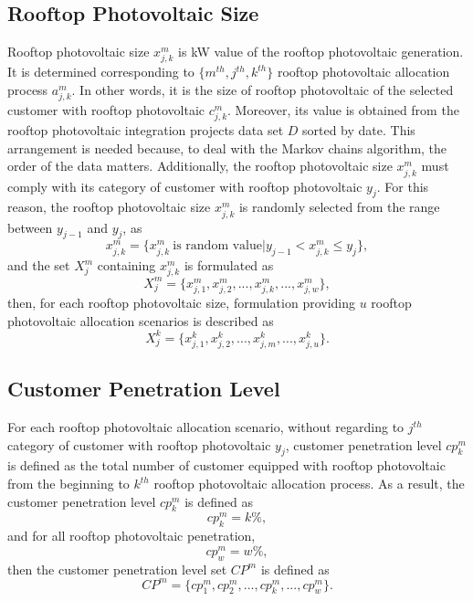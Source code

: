 \subsection{Rooftop Photovoltaic Size}
Rooftop photovoltaic size $x^m_{j,k}$ is kW value of the rooftop photovoltaic generation. It is determined corresponding to $\{m^{th},j^{th},k^{th}\}$ rooftop photovoltaic allocation process $a^m_{j,k}$. In other words, it is the size of rooftop photovoltaic of the selected customer with rooftop photovoltaic $c^m_{j,k}$. Moreover, its value is obtained from the rooftop photovoltaic integration projects data set $\mathit{D}$ sorted by date. This arrangement is needed because, to deal with the Markov chains algorithm, the order of the data matters. Additionally, the rooftop photovoltaic size $x^m_{j,k}$ must comply with its category of customer with rooftop photovoltaic $y_j$. For this reason, the rooftop photovoltaic size $x^m_{j,k}$ is randomly selected from the range between $y_{j-1}$ and $y_j$, as
\begin{equation}\label{xpv1}
x^m_{j,k}=\{x^m_{j,k}\ \text{is random value}|y_{j-1} < x^m_{j,k} \leq y_j\},
\end{equation}
and the set $\mathit{X^m_j}$ containing $x^m_{j,k}$ is formulated as
\begin{equation}\label{xpv2}
\mathit{X^m_j}=\{x^m_{j,1},x^m_{j,2},...,x^m_{j,k},...,x^m_{j,w}\},
\end{equation}
then, for each rooftop photovoltaic size, formulation providing $u$ rooftop photovoltaic allocation scenarios is described as
\begin{equation}\label{xpv3}
\mathit{X^k_j}=\{x^k_{j,1},x^k_{j,2},...,x^k_{j,m},...,x^k_{j,u}\}.
\end{equation}
\subsection{Customer Penetration Level}
For each rooftop photovoltaic allocation scenario, without regarding to $j^{th}$ category of customer with rooftop photovoltaic $y_j$, customer penetration level $cp^m_k$ is defined as the total number of customer equipped with rooftop photovoltaic from the beginning to $k^{th}$ rooftop photovoltaic allocation process. As a result, the customer penetration level $cp^m_k$ is defined as
\begin{equation}\label{cpl1}
cp^m_k=k\%,
\end{equation}
and for all rooftop photovoltaic penetration,
\begin{equation}\label{cpl2}
cp^m_w=w\%,
\end{equation}
then the customer penetration level set $\mathit{CP^m}$ is defined as
\begin{equation}\label{cpl3}
\mathit{CP^m}=\{cp^m_1,cp^m_2,...,cp^m_k,...,cp^m_w\}.
\end{equation}

